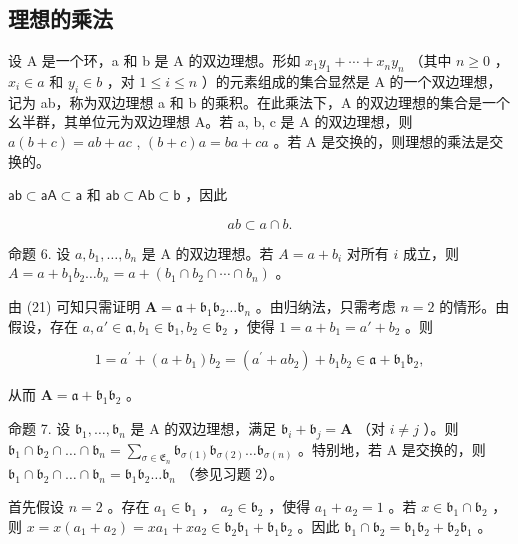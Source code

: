 \subsection{理想的乘法}

设 A 是一个环，a 和 b 是 A 的双边理想。形如 \(x_{1}y_{1} + \cdots + x_{n}y_{n}\) （其中 \(n \geqslant 0\) ， \(x_{i} \in a\) 和 \(y_{i} \in b\) ，对 \(1 \leqslant i \leqslant n\) ）的元素组成的集合显然是 A 的一个双边理想，记为 ab，称为双边理想 a 和 b 的乘积。在此乘法下，A 的双边理想的集合是一个幺半群，其单位元为双边理想 A。若 a, b, c 是 A 的双边理想，则 \(a(b + c) = ab + ac\) , \((b + c)a = ba + ca\) 。若 A 是交换的，则理想的乘法是交换的。

\(\mathsf{ab}\subset \mathsf{aA}\subset \mathsf{a}\) 和 \(\mathsf{ab}\subset \mathsf{Ab}\subset \mathsf{b}\) ，因此

\[
a b \subset a \cap b.\tag{21}
\]

命题 6. 设 \(a, b_{1}, \ldots, b_{n}\) 是 A 的双边理想。若 \(A = a + b_{i}\) 对所有 \(i\) 成立，则 \(A = a + b_{1}b_{2} \ldots b_{n} = a + (b_{1} \cap b_{2} \cap \cdots \cap b_{n})\) 。

由 (21) 可知只需证明 \(\mathbf{A} = \mathfrak{a} + \mathfrak{b}_1\mathfrak{b}_2\ldots \mathfrak{b}_n\) 。由归纳法，只需考虑 \(n = 2\) 的情形。由假设，存在 \(a, a' \in \mathfrak{a}, b_1 \in \mathfrak{b}_1, b_2 \in \mathfrak{b}_2\) ，使得 \(1 = a + b_1 = a' + b_2\) 。则

\[
1 = a ^ {\prime} + (a + b _ {1}) b _ {2} = \left(a ^ {\prime} + a b _ {2}\right) + b _ {1} b _ {2} \in \mathfrak {a} + \mathfrak {b} _ {1} \mathfrak {b} _ {2},
\]

从而 \(\mathbf{A} = \mathfrak{a} + \mathfrak{b}_1\mathfrak{b}_2\) 。

命题 7. 设 \(\mathfrak{b}_1, \ldots, \mathfrak{b}_n\) 是 A 的双边理想，满足 \(\mathfrak{b}_i + \mathfrak{b}_j = \mathbf{A}\) （对 \(i \neq j\) ）。则 \(\mathfrak{b}_1 \cap \mathfrak{b}_2 \cap \dots \cap \mathfrak{b}_n = \sum_{\sigma \in \mathfrak{E}_n} \mathfrak{b}_{\sigma(1)} \mathfrak{b}_{\sigma(2)} \ldots \mathfrak{b}_{\sigma(n)}\) 。特别地，若 A 是交换的，则 \(\mathfrak{b}_1 \cap \mathfrak{b}_2 \cap \dots \cap \mathfrak{b}_n = \mathfrak{b}_1 \mathfrak{b}_2 \ldots \mathfrak{b}_n\) （参见习题 2）。

首先假设 \(n = 2\) 。存在 \(a_1 \in \mathfrak{b}_1\) ， \(a_2 \in \mathfrak{b}_2\) ，使得 \(a_1 + a_2 = 1\) 。若 \(x \in \mathfrak{b}_1 \cap \mathfrak{b}_2\) ，则 \(x = x(a_1 + a_2) = xa_1 + xa_2 \in \mathfrak{b}_2\mathfrak{b}_1 + \mathfrak{b}_1\mathfrak{b}_2\) 。因此 \(\mathfrak{b}_1 \cap \mathfrak{b}_2 = \mathfrak{b}_1\mathfrak{b}_2 + \mathfrak{b}_2\mathfrak{b}_1\) 。

